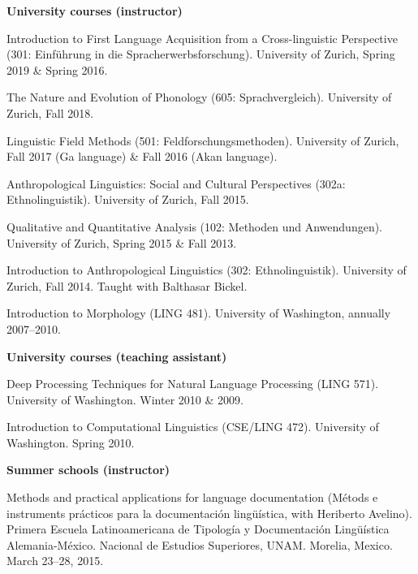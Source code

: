 \documentclass[11pt]{article}
\newcommand{\hangpara}{
 \setlength{\parindent}{0in} %
 \hangindent=0.42in %
}
\begin{document}
\begin{flushleft}
{\bf University courses (instructor)}
\end{flushleft}


\hangpara Introduction to First Language Acquisition from a Cross-linguistic Perspective (301: Einf{\"u}hrung in die Spracherwerbsforschung). University of Zurich, Spring 2019 \& Spring 2016.

\vskip 6pt
\hangpara The Nature and Evolution of Phonology (605: Sprachvergleich). University of Zurich, Fall 2018.

\vskip 6pt
\hangpara Linguistic Field Methods (501: Feldforschungsmethoden). University of Zurich, Fall 2017 (Ga language) \& Fall 2016 (Akan language).

\vskip 6pt
\hangpara Anthropological Linguistics: Social and Cultural Perspectives (302a: Ethnolinguistik). University of Zurich, Fall 2015.

\vskip 6pt
\hangpara Qualitative and Quantitative Analysis (102: Methoden und Anwendungen). University of Zurich, Spring 2015 \& Fall 2013.

\vskip 6pt
\hangpara Introduction to Anthropological Linguistics (302: Ethnolinguistik). University of Zurich, Fall 2014. Taught with Balthasar Bickel.

\vskip 6pt
\hangpara Introduction to Morphology (LING 481). University of Washington, annually 2007--2010.

\begin{flushleft}
{\bf University courses (teaching assistant)}
\end{flushleft}
\hangpara Deep Processing Techniques for Natural Language Processing (LING 571). University of Washington. Winter 2010 \& 2009.

\vskip 6pt
\hangpara %
Introduction to Computational Linguistics (CSE/LING 472). University of Washington. Spring 2010.

\begin{flushleft}
{\bf Summer schools (instructor)}
\end{flushleft}
\hangpara Methods and practical applications for language documentation (M{\'e}tods e instruments pr{\'a}cticos para la documentaci{\'o}n ling{\"u}{\'i}stica, with Heriberto Avelino). Primera Escuela Latinoamericana de Tipolog{\'i}a y Documentaci{\'o}n Ling{\"u}{\'i}stica Alemania-M{\'e}xico. Nacional de Estudios Superiores, UNAM. Morelia, Mexico. March 23--28, 2015.
\end{document}
